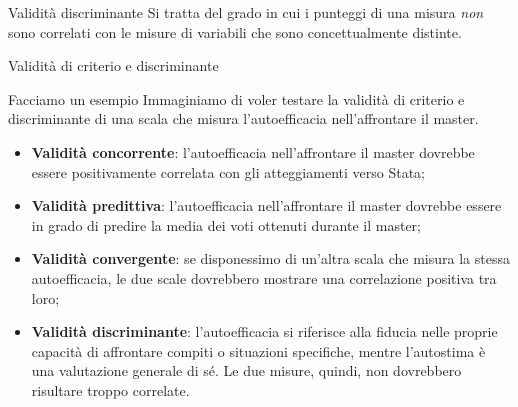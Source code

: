\documentclass{beamer}
\begin{document}
\begin{frame}{Validità discriminante}
    Si tratta del grado in cui i punteggi di una misura \textit{non} sono correlati con le misure di variabili che sono concettualmente distinte.
\end{frame}

\begin{frame}{Validità di criterio e discriminante}
    \small
    \begin{block}{Facciamo un esempio}
    Immaginiamo di voler testare la validità di criterio e discriminante di una scala che misura l'autoefficacia nell'affrontare il master.
        \begin{itemize}
            \item \textbf{Validità concorrente}: l'autoefficacia nell'affrontare il master dovrebbe essere positivamente correlata con gli atteggiamenti verso Stata;
            \item \textbf{Validità predittiva}: l'autoefficacia nell'affrontare il master dovrebbe essere in grado di predire la media dei voti ottenuti durante il master;
            \item \textbf{Validità convergente}: se disponessimo di un'altra scala che misura la stessa autoefficacia, le due scale dovrebbero mostrare una correlazione positiva tra loro;
            \item \textbf{Validità discriminante}: l'autoefficacia si riferisce alla fiducia nelle proprie capacità di affrontare compiti o situazioni specifiche, mentre l'autostima è una valutazione generale di sé. Le due misure, quindi, non dovrebbero risultare troppo correlate.
        \end{itemize}
    \end{block}
\end{frame}
\end{document}
